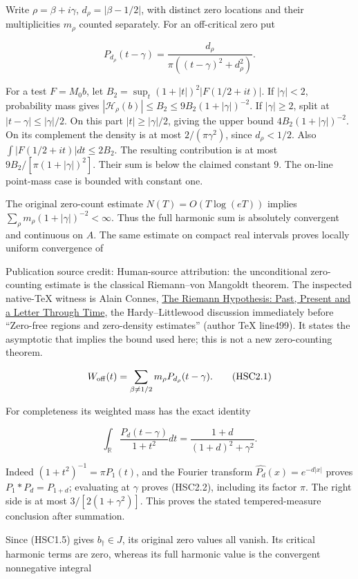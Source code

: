 Write \(\rho=\beta+i\gamma\), \(d_\rho=|\beta-1/2|\), with distinct zero
locations and their multiplicities \(m_\rho\) counted separately. For an
off-critical zero put

\[
 P_{d_\rho}(t-\gamma)=\frac{d_\rho}{\pi((t-\gamma)^2+d_\rho^2)}.
\]

For a test \(F=M_0b\), let \(B_2=\sup_t(1+|t|)^2|F(1/2+it)|\). If
\(|\gamma|<2\), probability mass gives
\(|\mathcal H_\rho(b)|\le B_2\le9B_2(1+|\gamma|)^{-2}\). If
\(|\gamma|\ge2\), split at \(|t-\gamma|\le|\gamma|/2\). On this part
\(|t|\ge|\gamma|/2\), giving the upper bound \(4B_2(1+|\gamma|)^{-2}\).
On its complement the density is at most \(2/(\pi\gamma^2)\), since
\(d_\rho<1/2\). Also \(\int|F(1/2+it)|dt\le2B_2\). The resulting
contribution is at most \(9B_2/[\pi(1+|\gamma|)^2]\). Their sum is below
the claimed constant \(9\). The on-line point-mass case is bounded with
constant one.

The original zero-count estimate \(N(T)=O(T\log(eT))\) implies
\(\sum_\rho m_\rho(1+|\gamma|)^{-2}<\infty\). Thus the full harmonic sum
is absolutely convergent and continuous on \(A\). The same estimate on
compact real intervals proves locally uniform convergence of

Publication source credit: Human-source attribution: the unconditional
zero-counting estimate is the classical Riemann--von Mangoldt theorem.
The inspected native-TeX witness is Alain Connes,
\href{https://arxiv.org/abs/2602.04022v1}{The Riemann Hypothesis: Past,
Present and a Letter Through Time}, the Hardy--Littlewood discussion
immediately before ``Zero-free regions and zero-density estimates''
(author TeX line499). It states the asymptotic that implies the bound
used here; this is not a new zero-counting theorem.

\[
 W_{\rm off}(t)=\sum_{\beta\ne1/2}m_\rho P_{d_\rho}(t-\gamma).
\tag{HSC2.1}
\]

For completeness its weighted mass has the exact identity

\[
 \int_{\mathbb R}\frac{P_d(t-\gamma)}{1+t^2}dt
 =\frac{1+d}{(1+d)^2+\gamma^2}.
\tag{HSC2.2}
\]

Indeed \((1+t^2)^{-1}=\pi P_1(t)\), and the Fourier transform
\(\widehat{P_d}(x)=e^{-d|x|}\) proves \(P_1*P_d=P_{1+d}\); evaluating at
\(\gamma\) proves (HSC2.2), including its factor \(\pi\). The right side
is at most \(3/[2(1+\gamma^2)]\). This proves the stated
tempered-measure conclusion after summation.

Since (HSC1.5) gives \(b_\dagger\in J\), its original zero values all
vanish. Its critical harmonic terms are zero, whereas its full harmonic
value is the convergent nonnegative integral


